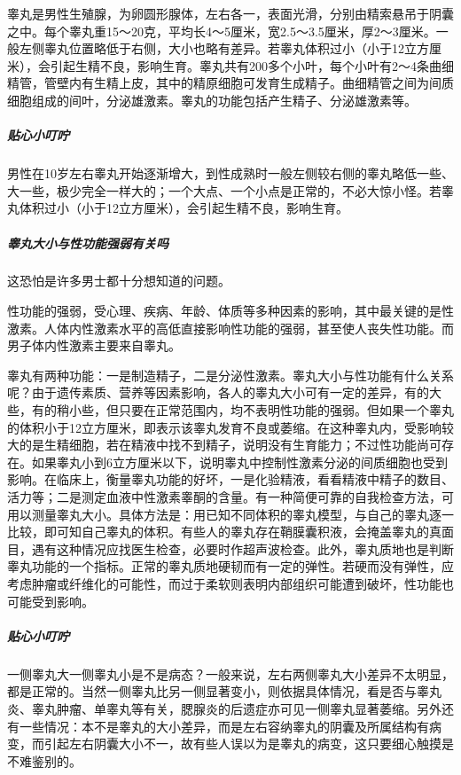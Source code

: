 \begin{enumerate}
睾丸是男性生殖腺，为卵圆形腺体，左右各一，表面光滑，分别由精索悬吊于阴囊之中。每个睾丸重15～20克，平均长4～5厘米，宽2.5～3.5厘米，厚2～3厘米。一般左侧睾丸位置略低于右侧，大小也略有差异。若睾丸体积过小（小于12立方厘米），会引起生精不良，影响生育。睾丸共有200多个小叶，每个小叶有2～4条曲细精管，管壁内有生精上皮，其中的精原细胞可发育生成精子。曲细精管之间为间质细胞组成的间叶，分泌雄激素。睾丸的功能包括产生精子、分泌雄激素等。

\subparagraph{贴心小叮咛}

男性在10岁左右睾丸开始逐渐增大，到性成熟时一般左侧较右侧的睾丸略低一些、大一些，极少完全一样大的；一个大点、一个小点是正常的，不必大惊小怪。若睾丸体积过小（小于12立方厘米），会引起生精不良，影响生育。

\subparagraph{睾丸大小与性功能强弱有关吗}

这恐怕是许多男士都十分想知道的问题。

性功能的强弱，受心理、疾病、年龄、体质等多种因素的影响，其中最关键的是性激素。人体内性激素水平的高低直接影响性功能的强弱，甚至使人丧失性功能。而男子体内性激素主要来自睾丸。

睾丸有两种功能：一是制造精子，二是分泌性激素。睾丸大小与性功能有什么关系呢？由于遗传素质、营养等因素影响，各人的睾丸大小可有一定的差异，有的大些，有的稍小些，但只要在正常范围内，均不表明性功能的强弱。但如果一个睾丸的体积小于12立方厘米，即表示该睾丸发育不良或萎缩。在这种睾丸内，受影响较大的是生精细胞，若在精液中找不到精子，说明没有生育能力；不过性功能尚可存在。如果睾丸小到6立方厘米以下，说明睾丸中控制性激素分泌的间质细胞也受到影响。在临床上，衡量睾丸功能的好坏，一是化验精液，看看精液中精子的数目、活力等；二是测定血液中性激素睾酮的含量。有一种简便可靠的自我检查方法，可用以测量睾丸大小。具体方法是：用已知不同体积的睾丸模型，与自己的睾丸逐一比较，即可知自己睾丸的体积。有些人的睾丸存在鞘膜囊积液，会掩盖睾丸的真面目，遇有这种情况应找医生检查，必要时作超声波检查。此外，睾丸质地也是判断睾丸功能的一个指标。正常的睾丸质地硬韧而有一定的弹性。若硬而没有弹性，应考虑肿瘤或纤维化的可能性，而过于柔软则表明内部组织可能遭到破坏，性功能也可能受到影响。

\subparagraph{贴心小叮咛}

一侧睾丸大一侧睾丸小是不是病态？一般来说，左右两侧睾丸大小差异不太明显，都是正常的。当然一侧睾丸比另一侧显著变小，则依据具体情况，看是否与睾丸炎、睾丸肿瘤、单睾丸等有关，腮腺炎的后遗症亦可见一侧睾丸显著萎缩。另外还有一些情况：本不是睾丸的大小差异，而是左右容纳睾丸的阴囊及所属结构有病变，而引起左右阴囊大小不一，故有些人误以为是睾丸的病变，这只要细心触摸是不难鉴别的。


\end{enumerate}
